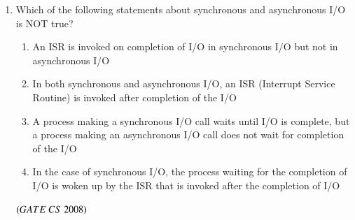 \documentclass[journal, onecolumn]{IEEEtran}
\numberwithin{equation}{enumi}
\numberwithin{figure}{enumi}
\begin{document}
\begin{enumerate}
\begin{verbatim}
P(s): s = s - 1;
      if s < 0 then wait;

V(s): s = s + 1;
      if s <= 0 then wakeup a process waiting on s;
\end{verbatim}

Assume that $P_b$ and $V_b$, the wait and signal operations on binary semaphores, are provided. 
Two binary semaphores $x_b$ and $y_b$ are used to implement the semaphore operations $P(s)$ and $V(s)$ as follows:


P(s):   $P_b$($x_b$);\\
        s = s - 1;\\
        if (s \l 0)  \\
            $V_b$($y_b$);\\
        else $V_b$($x_b$);

V(s):   $P_b$($x_b$);\\
        s = s + 1;\\
        if (s $\leq$ 0) $V_b$($y_b$);\\ 
        $V_b$($x_b$);\\
The initial values of $x_b$ and $y_b$ are respectively:
\begin{multicols}{4}
\begin{enumerate}
    \item 0 and 0
    \item 0 and 1
    \item 1 and 0
    \item 1 and 1
\end{enumerate}
\end{multicols}
\hfill $\brak{GATE\ CS\  2008}$

\item Which of the following statements about synchronous and asynchronous I/O is
NOT true? 
\begin{enumerate}
    \item An ISR is invoked on completion of I/O in synchronous I/O but not in
asynchronous I/O
   \item In both synchronous and asynchronous I/O, an ISR (Interrupt Service Routine) is invoked after completion of the I/O
   \item A process making a synchronous I/O call waits until I/O is complete, but a
process making an asynchronous I/O call does not wait for completion of the I/O
   \item In the case of synchronous I/O, the process waiting for the completion of I/O is woken up by the ISR that is invoked after the completion of I/O 
\end{enumerate}
\hfill $\brak{GATE\ CS\  2008}$
\bigskip


\end{enumerate}
\end{document}
